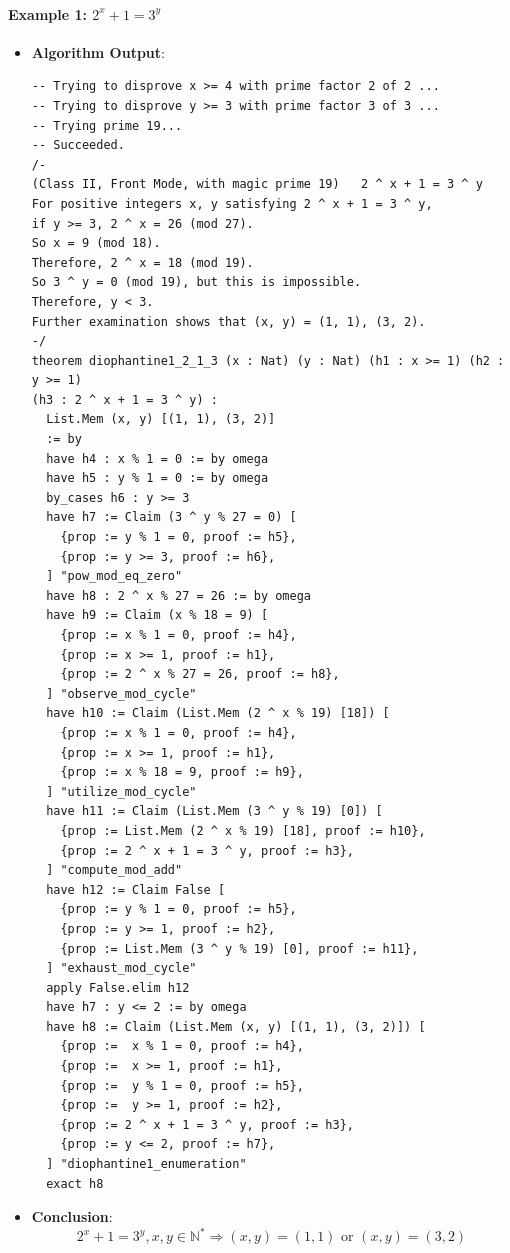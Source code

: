 \documentclass{article}
\begin{document}
\paragraph{Example 1: $2^x+1=3^y$}
\begin{itemize}
\item \textbf{Algorithm Output}:
    \begin{verbatim}
-- Trying to disprove x >= 4 with prime factor 2 of 2 ...
-- Trying to disprove y >= 3 with prime factor 3 of 3 ...
-- Trying prime 19...
-- Succeeded.
/-
(Class II, Front Mode, with magic prime 19)   2 ^ x + 1 = 3 ^ y
For positive integers x, y satisfying 2 ^ x + 1 = 3 ^ y,
if y >= 3, 2 ^ x = 26 (mod 27).
So x = 9 (mod 18).
Therefore, 2 ^ x = 18 (mod 19).
So 3 ^ y = 0 (mod 19), but this is impossible.
Therefore, y < 3.
Further examination shows that (x, y) = (1, 1), (3, 2).
-/
theorem diophantine1_2_1_3 (x : Nat) (y : Nat) (h1 : x >= 1) (h2 : y >= 1) 
(h3 : 2 ^ x + 1 = 3 ^ y) :      
  List.Mem (x, y) [(1, 1), (3, 2)]
  := by
  have h4 : x % 1 = 0 := by omega
  have h5 : y % 1 = 0 := by omega
  by_cases h6 : y >= 3
  have h7 := Claim (3 ^ y % 27 = 0) [
    {prop := y % 1 = 0, proof := h5},
    {prop := y >= 3, proof := h6},
  ] "pow_mod_eq_zero"
  have h8 : 2 ^ x % 27 = 26 := by omega
  have h9 := Claim (x % 18 = 9) [
    {prop := x % 1 = 0, proof := h4},
    {prop := x >= 1, proof := h1},
    {prop := 2 ^ x % 27 = 26, proof := h8},
  ] "observe_mod_cycle"
  have h10 := Claim (List.Mem (2 ^ x % 19) [18]) [
    {prop := x % 1 = 0, proof := h4},
    {prop := x >= 1, proof := h1},
    {prop := x % 18 = 9, proof := h9},
  ] "utilize_mod_cycle"
  have h11 := Claim (List.Mem (3 ^ y % 19) [0]) [
    {prop := List.Mem (2 ^ x % 19) [18], proof := h10},
    {prop := 2 ^ x + 1 = 3 ^ y, proof := h3},
  ] "compute_mod_add"
  have h12 := Claim False [
    {prop := y % 1 = 0, proof := h5},
    {prop := y >= 1, proof := h2},
    {prop := List.Mem (3 ^ y % 19) [0], proof := h11},
  ] "exhaust_mod_cycle"
  apply False.elim h12
  have h7 : y <= 2 := by omega
  have h8 := Claim (List.Mem (x, y) [(1, 1), (3, 2)]) [
    {prop :=  x % 1 = 0, proof := h4},
    {prop :=  x >= 1, proof := h1},
    {prop :=  y % 1 = 0, proof := h5},
    {prop :=  y >= 1, proof := h2},
    {prop := 2 ^ x + 1 = 3 ^ y, proof := h3},
    {prop := y <= 2, proof := h7},
  ] "diophantine1_enumeration"
  exact h8
    \end{verbatim}
    \item \textbf{Conclusion}:
    \[ 2^x+1=3^y, x, y \in \mathbb{N}^* \Rightarrow (x,y)=(1,1) \text{ or } (x,y)=(3,2) \]
\end{itemize}
\end{document}
